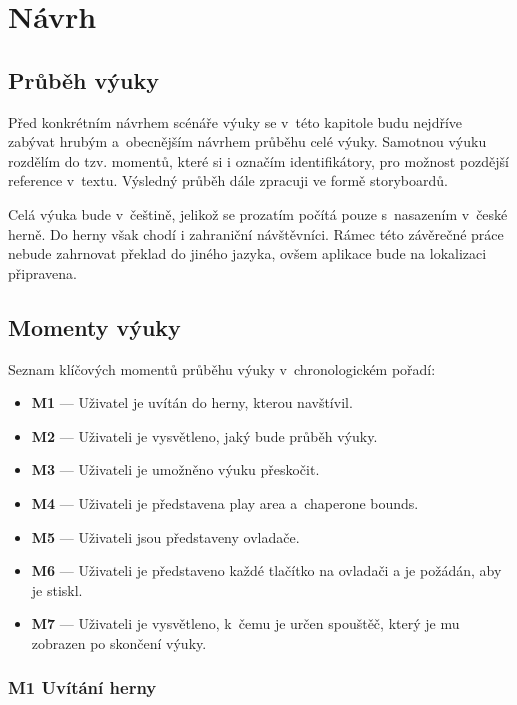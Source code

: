 \chapter{Návrh}\label{nuxe1vrh}

\section{Průběh výuky}\label{prux16fbux11bh-vuxfduky-2}

Před konkrétním návrhem scénáře výuky se v~této kapitole budu
nejdříve zabývat hrubým a~obecnějším návrhem průběhu celé výuky.
Samotnou výuku rozdělím do tzv. momentů, které si i označím
identifikátory, pro možnost pozdější reference v~textu. Výsledný průběh dále zpracuji ve formě storyboardů.

Celá výuka bude v~češtině, jelikož se prozatím počítá pouze s~nasazením
v~české herně. Do herny však chodí i zahraniční návštěvníci. Rámec této
závěrečné práce nebude zahrnovat překlad do jiného jazyka, ovšem
aplikace bude na lokalizaci připravena.

\newpage

\section{Momenty výuky}\label{momenty-vuxfduky}

Seznam klíčových momentů průběhu výuky v~chronologickém pořadí:

\begin{itemize}
\tightlist
\item
  \textbf{M1} --- Uživatel je uvítán do herny, kterou navštívil.
\item
  \textbf{M2} --- Uživateli je vysvětleno, jaký bude průběh výuky.
\item
  \textbf{M3} --- Uživateli je umožněno výuku přeskočit.
\item
  \textbf{M4} --- Uživateli je představena play area a~chaperone bounds.
\item
  \textbf{M5} --- Uživateli jsou představeny ovladače.
\item
  \textbf{M6} --- Uživateli je představeno každé tlačítko na ovladači a
  je požádán, aby je stiskl.
\item
  \textbf{M7} --- Uživateli je vysvětleno, k~čemu je určen spouštěč,
  který je mu zobrazen po skončení výuky.
\end{itemize}

\subsection{M1 Uvítání herny}\label{m1-uvuxedtuxe1nuxed-herny}

